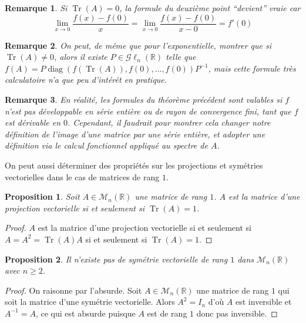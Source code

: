 \documentclass[a4paper]{article}
\newtheorem*{remark}{Remarque}
\newtheorem*{proposition}{Proposition}
\begin{document}
\begin{remark}
    Si $\operatorname{Tr}(A) = 0$, la formule du deuxième point ``devient'' vraie car
    $$\displaystyle \lim_{x \to 0} \frac{f(x) - f(0)}{x} =\lim_{x \to 0} \frac{f(x) - f(0)}{x - 0} = f'(0)$$
\end{remark}

\begin{remark}
    On peut, de même que pour l'exponentielle, montrer que si $\operatorname{Tr}(A) \neq 0$, alors il existe $P \in \mathcal{G}\ell_n(\mathbb{R})$ telle que $f(A) = P\operatorname{diag}(f(\operatorname{Tr}(A)), f(0), \dots, f(0))P^{-1}$, mais cette formule très calculatoire n'a que peu d'intérêt en pratique.
\end{remark}

\begin{remark}
    En réalité, les formules du théorème précédent sont valables si $f$ n'est pas développable en série entière ou de rayon de convergence fini, tant que $f$ est dérivable en $0$. Cependant, il faudrait pour montrer cela changer notre définition de l'image d'une matrice par une série entière, et adopter une définition \emph{via} le calcul fonctionnel appliqué au spectre de $A$.
\end{remark}

On peut aussi déterminer des propriétés sur les projections et symétries vectorielles dans le cas de matrices de rang $1$.

\begin{proposition}
    Soit $A \in \mathcal{M}_{n}(\mathbb{R})$ une matrice de rang $1$. $A$ est la matrice d'une projection vectorielle si et seulement si $\operatorname{Tr}(A) = 1$.
\end{proposition}

\begin{proof}
    $A$ est la matrice d'une projection vectorielle si et seulement si $A = A^2 = \operatorname{Tr}(A) A$ si et seulement si $\operatorname{Tr}(A) = 1$.
\end{proof}

\begin{proposition}
    Il n'existe pas de symétrie vectorielle de rang $1$ dans  $\mathcal{M}_{n}(\mathbb{R})$ avec $n \geq 2$.
\end{proposition}

\begin{proof}
    On raisonne par l'absurde. Soit $A \in \mathcal{M}_{n}(\mathbb{R})$ une matrice de rang $1$ qui soit la matrice d'une symétrie vectorielle. Alors $A^2 = I_n$ d'où $A$ est inversible et $A^{-1} = A$, ce qui est absurde puisque $A$ est de rang $1$ donc pas inversible.
\end{proof}
\end{document}
